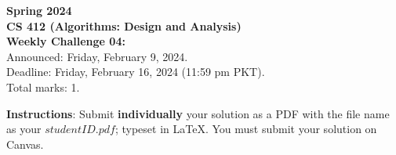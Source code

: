 \documentclass[a4paper]{exam}
\begin{document}
\begin{center}
{\Large \textbf{Spring 2024}}\vspace{1.0em}\\
{\Large \textbf{CS 412 (Algorithms: Design and Analysis)}}\vspace{1.0em}\\
{\Large \textbf{Weekly Challenge 04: }}\vspace{1.0em}\\
{\Large Announced: Friday, February 9, 2024.}\\
\vspace{.25em}
{\Large Deadline: Friday, February 16, 2024 (11:59 pm PKT).}\\ 
\vspace{.3em}
{\Large Total marks: 1.}
\vspace{.5em}\\
\end{center}
\textbf{Instructions}: Submit \textbf{individually} your solution as a PDF with the file name as your $studentID.pdf$; typeset in LaTeX. You must submit your solution on Canvas.
\end{document}
